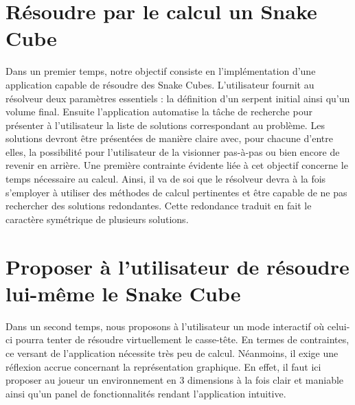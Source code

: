 \section{Résoudre par le calcul un Snake Cube}
Dans un premier temps, notre objectif consiste en l’implémentation d’une application capable de résoudre des Snake Cubes. L’utilisateur fournit au résolveur deux paramètres essentiels : la définition d’un serpent initial ainsi qu’un volume final. Ensuite l’application automatise la tâche de recherche pour présenter à l’utilisateur la liste de solutions correspondant au problème. Les solutions devront être présentées de manière claire avec, pour chacune d’entre elles, la possibilité pour l’utilisateur de la visionner pas-à-pas ou bien encore de revenir en arrière. Une première contrainte évidente liée à cet objectif concerne le temps nécessaire au calcul. Ainsi, il va de soi que le résolveur devra à la fois s’employer à utiliser des méthodes de calcul pertinentes et être capable de ne pas rechercher des solutions redondantes. Cette redondance traduit en fait le caractère symétrique de plusieurs solutions.

\section{Proposer à l'utilisateur de résoudre lui-même le Snake Cube}
Dans un second temps, nous proposons à l’utilisateur un mode interactif où celui-ci pourra tenter de résoudre virtuellement le casse-tête. En termes de contraintes, ce versant de l’application nécessite très peu de calcul. Néanmoins, il exige une réflexion accrue concernant la représentation graphique. En effet, il faut ici proposer au joueur un environnement en 3 dimensions à la fois clair et maniable ainsi qu’un panel de fonctionnalités rendant l’application intuitive.
